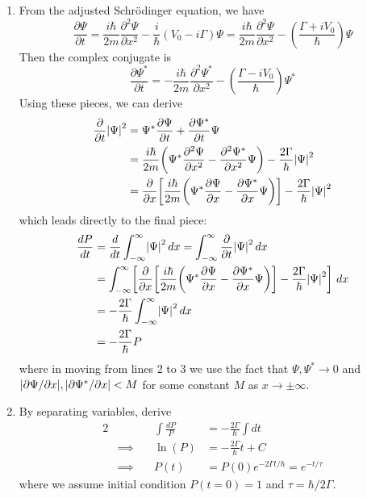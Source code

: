 \documentclass[a4paper]{article}
\begin{document}
\begin{enumerate}[label=(\alph*)]
	\item From the adjusted Schr\"odinger equation, we have
	\[
		\frac{\partial \Psi}{\partial t} = \frac{i \hbar}{2m}\frac{\partial^2 \Psi}{\partial x^2} - \frac{i}{\hbar}\!\left( V_{0} - i \Gamma \right)\Psi = \frac{i \hbar}{2m}\frac{\partial^2 \Psi}{\partial x^2} - \!\left( \frac{\Gamma + iV_{0}}{\hbar} \right)\Psi
	\]
	Then the complex conjugate is
	\[
		\frac{\partial \Psi^{*}}{\partial t} = -\frac{i \hbar}{2m}\frac{\partial^2 \Psi^{*}}{\partial x^2} - \!\left( \frac{\Gamma - iV_{0}}{\hbar} \right)\Psi^{*}
	\]
	Using these pieces, we can derive
	\begin{align*}
		\frac{\partial }{\partial t}\abs{\Psi}^{2} & = \Psi^{*}\frac{\partial \Psi}{\partial t} + \frac{\partial \Psi^{*}}{\partial t}\Psi \\
		 & = \frac{i \hbar}{2m}\!\left( \Psi^{*}\frac{\partial^2 \Psi}{\partial x^2} - \frac{\partial^2 \Psi^{*}}{\partial x^2}\Psi \right) - \frac{2 \Gamma}{\hbar}\abs{\Psi}^{2} \\
		 & = \frac{\partial }{\partial x}\!\left[ \frac{i \hbar}{2m}\!\left( \Psi^{*}\frac{\partial \Psi}{\partial x} - \frac{\partial \Psi^{*}}{\partial x}\Psi \right) \right] - \frac{2 \Gamma}{\hbar}\abs{\Psi}^{2}
	\end{align*}
	which leads directly to the final piece:
	\begin{align*}
		\frac{d P}{d t} & = \frac{d }{d t}\int^{\infty}_{-\infty} \abs{\Psi}^{2} \, dx = \int^{\infty}_{-\infty} \frac{\partial }{\partial t}\abs{\Psi}^{2} \, dx \\
				& = \int^{\infty}_{-\infty} \!\left[ \frac{\partial }{\partial x}\!\left[ \frac{i \hbar}{2m}\!\left( \Psi^{*}\frac{\partial \Psi}{\partial x} - \frac{\partial \Psi^{*}}{\partial x}\Psi \right) \right] - \frac{2 \Gamma}{\hbar}\abs{\Psi}^{2} \right] \, dx \\
				& = -\frac{2 \Gamma}{\hbar}\int^{\infty}_{-\infty} \abs{\Psi}^{2} \, dx \\
				& = -\frac{2 \Gamma}{\hbar}P
	\end{align*}
	where in moving from lines 2 to 3 we use the fact that \( \Psi,\Psi^{*} \rightarrow 0 \) and \( \abs{\partial \Psi / \partial x}, \abs{\partial \Psi^{*} / \partial x} < M \) for some constant \( M \) as \( x \rightarrow \pm \infty \). 
	\item By separating variables, derive
	\begin{alignat*}{2}
		&                    & \int \frac{dP}{P} & = -\frac{2 \Gamma}{\hbar}\int dt \\
		& \implies \quad     & \ln\!\left(P\right) & = -\frac{2 \Gamma}{\hbar}t + C \\
		& \implies           & P \!\left( t \right) & = P \!\left( 0 \right) e^{-2 \Gamma t / \hbar} = e^{-t / \tau}
	\end{alignat*}
	where we assume initial condition \( P \!\left( t = 0 \right) = 1 \) and \( \tau = \hbar / 2 \Gamma \).
\end{enumerate}
\end{document}
